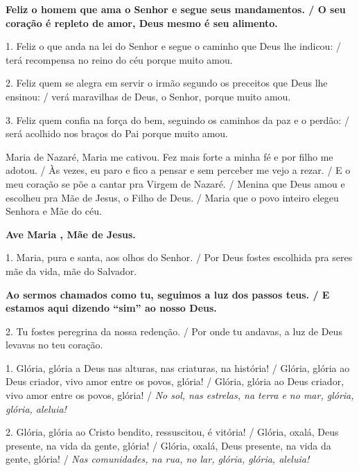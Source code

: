 \documentclass[a5paper,9pt]{extarticle}
\begin{document}
\begin{cantos}
\begin{canto}
\textbf{Feliz o homem que ama o Senhor e segue seus mandamentos. / O seu coração é repleto de amor, Deus mesmo é seu alimento.}

1. Feliz o que anda na lei do Senhor e segue o caminho que Deus lhe indicou: / terá recompensa no reino do céu porque muito amou.

2. Feliz quem se alegra em servir o irmão segundo os preceitos que Deus lhe ensinou: / verá maravilhas de Deus, o Senhor, porque muito amou.

3. Feliz quem confia na força do bem, seguindo os caminhos da paz e o perdão: / será acolhido nos braços do Pai porque muito amou.
\end{canto}

\begin{canto}
Maria de Nazaré, Maria me cativou. Fez mais forte a minha fé e por filho me adotou. / Às vezes, eu paro e fico a pensar e sem perceber me vejo a rezar. / E o meu coração se põe a cantar pra Virgem de Nazaré. / Menina que Deus amou e escolheu pra Mãe de Jesus, o Filho de Deus. / Maria que o povo inteiro elegeu Senhora e Mãe do céu.

\textbf{Ave Maria , Mãe de Jesus.}
\end{canto}

\begin{canto}
1. Maria, pura e santa, aos olhos do Senhor. / Por Deus fostes escolhida pra seres mãe da vida, mãe do Salvador.

\textbf{Ao sermos chamados como tu, seguimos a luz dos passos teus. / E estamos aqui dizendo ``sim'' ao nosso Deus. }

2. Tu fostes peregrina da nossa redenção. / Por onde tu andavas, a luz de Deus levavas no teu coração.
\end{canto}

\begin{canto}
1. Glória, glória a Deus nas alturas, nas criaturas, na história! / Glória, glória ao Deus criador, vivo amor entre os povos, glória! / Glória, glória ao Deus criador, vivo amor entre os povos, glória! / \emph{No sol, nas estrelas, na terra e no mar, glória, glória, aleluia! }

2. Glória, glória ao Cristo bendito, ressuscitou, é vitória! / Glória, oxalá, Deus presente, na vida da gente, glória! / Glória, oxalá, Deus presente, na vida da gente, glória! / \emph{Nas comunidades, na rua, no lar, glória, glória, aleluia! }


\end{canto}
\end{cantos}
\end{document}

